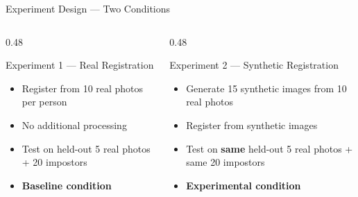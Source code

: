 \documentclass[aspectratio=169]{beamer}
\begin{document}
\begin{frame}{Experiment Design — Two Conditions}

\vspace{4pt}
\begin{columns}[T]
\begin{column}{0.48\textwidth}
    \begin{block}{Experiment 1 — Real Registration}
        \begin{itemize}
            \item Register from 10 real photos per person
            \item No additional processing
            \item Test on held-out 5 real photos + 20 impostors
            \item \textbf{Baseline condition}
        \end{itemize}
    \end{block}
\end{column}
\begin{column}{0.48\textwidth}
    \begin{block}{Experiment 2 — Synthetic Registration}
        \begin{itemize}
            \item Generate 15 synthetic images from 10 real photos
            \item Register from synthetic images
            \item Test on \textbf{same} held-out 5 real photos + same 20 impostors
            \item \textbf{Experimental condition}
        \end{itemize}
    \end{block}
\end{column}
\end{columns}

\vspace{12pt}
\begin{center}
\end{center}
\end{frame}
\end{document}

